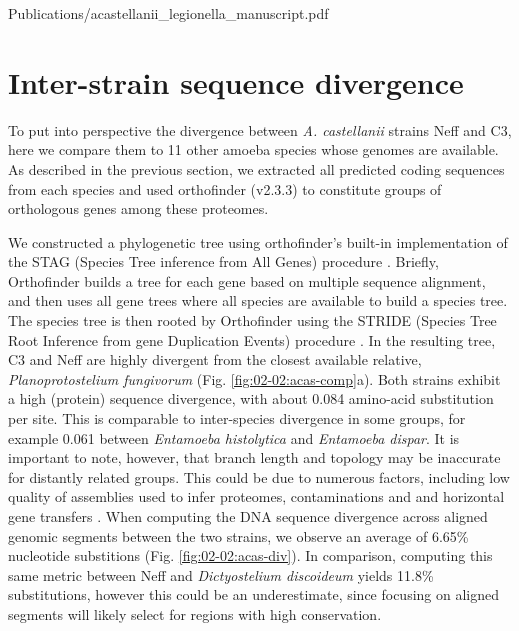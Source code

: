 
     {Publications/acastellanii_legionella_manuscript.pdf}    


\section{Inter-strain sequence divergence}

To put into perspective the divergence between \textit{A. castellanii} strains Neff and C3, here we compare them to 11 other amoeba species whose genomes are available. As described in the previous section, we extracted all predicted coding sequences from each species and used orthofinder (v2.3.3) to constitute groups of orthologous genes among these proteomes.

We constructed a phylogenetic tree using orthofinder's built-in implementation of the STAG (Species Tree inference from All Genes) procedure \cite{emmsSTAGSpeciesTree2018}. Briefly, Orthofinder builds a tree for each gene based on multiple sequence alignment, and then uses all gene trees where all species are available to build a species tree. The species tree is then rooted by Orthofinder using the STRIDE (Species Tree Root Inference from gene Duplication Events) procedure \cite{emmsSTRIDESpeciesTree2017}. In the resulting tree, C3 and Neff are highly divergent from the closest available relative, \textit{Planoprotostelium fungivorum} (Fig. \ref{fig:02-02:acas-comp}a). Both strains exhibit a high (protein) sequence divergence, with about 0.084 amino-acid substitution per site. This is comparable to inter-species divergence in some groups, for example 0.061 between \textit{Entamoeba histolytica} and \textit{Entamoeba dispar}. It is important to note, however, that branch length and topology may be inaccurate for distantly related groups. This could be due to numerous factors, including low quality of assemblies used to infer proteomes, contaminations and and horizontal gene transfers \cite{kapliPhylogeneticTreeBuilding2020}. When computing the DNA sequence divergence across aligned genomic segments between the two strains, we observe an average of 6.65\% nucleotide substitions (Fig. \ref{fig:02-02:acas-div}). In comparison, computing this same metric between Neff and \textit{Dictyostelium discoideum} yields 11.8\% substitutions, however this could be an underestimate, since focusing on aligned segments will likely select for regions with high conservation.

